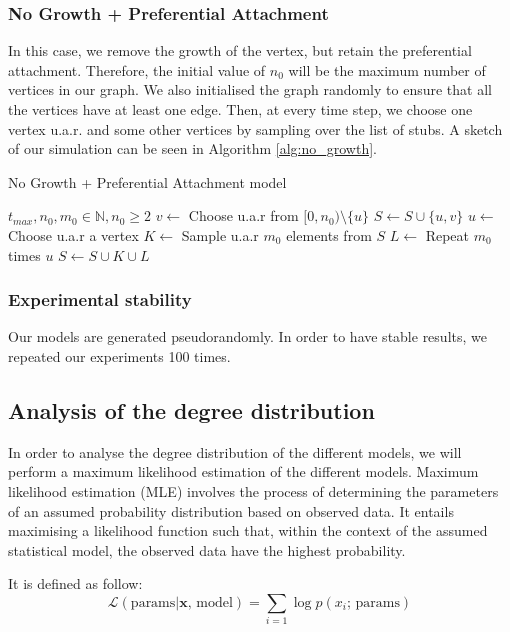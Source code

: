 \subsubsection{No Growth + Preferential Attachment}
In this case, we remove the growth of the vertex, but retain the preferential attachment. Therefore, the initial value of $n_0$ will be the maximum number of vertices in our graph. We also initialised the graph randomly to ensure that all the vertices have at least one edge. Then, at every time step, we choose one vertex u.a.r. and some other vertices by sampling over the list of stubs. A sketch of our simulation can be seen in Algorithm \ref{alg:no_growth}.

\begin{algorithm}[!htb]
\caption{No Growth + Preferential Attachment model}\label{alg:no_growth}
\begin{algorithmic}
\Require $t_{max}, n_0, m_0 \in \mathbb{N}, n_0 \geq 2$
\For{$u \in [0,n_0)$} 
    \State $v \gets $ Choose u.a.r from $[0,n_0) \setminus \{u\}$
    \State $S \gets S \cup \{u,v\}$
\EndFor
{}
    \State $u \gets$ Choose u.a.r a vertex
    \State $K \gets$ Sample u.a.r $m_0$ elements from $S$ \label{alg:no_growth:sample}
    \State $L \gets$ Repeat $m_0$ times $u$
    \State $S \gets S \cup K \cup L$
\EndFor
\end{algorithmic}
\end{algorithm}

\subsubsection{Experimental stability}
Our models are generated pseudorandomly. In order to have stable results, we repeated our experiments 100 times.

\subsection{Analysis of the degree distribution}
In order to analyse the degree distribution of the different models, we will perform a maximum likelihood estimation of the different models. Maximum likelihood estimation (MLE) involves the process of determining the parameters of an assumed probability distribution based on observed data. It entails maximising a likelihood function such that, within the context of the assumed statistical model, the observed data have the highest probability.

It is defined as follow:
$$
\mathcal{L}(\text{params} | \mathbf{x} \text{, model}) = \sum_{i=1} \log{p(x_i \text{; params})}
$$


